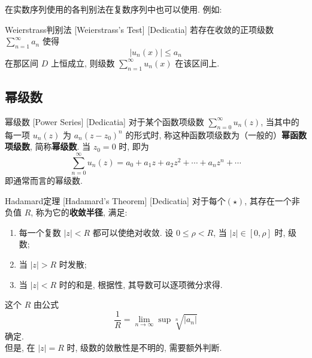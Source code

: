 \documentclass[UTF8]{ctexart}
\begin{document}
        在实数序列使用的各判别法在复数序列中也可以使用. 例如:

        \begin{thm}
            [UUID]
            {Weierstrass判别法}
            [Weierstrass's Test]
            [Dedicatia]
            若存在收敛的正项级数 \(\sum_{n = 1}^{\infty} a_n \) 使得\[|u_n(x)|\leqslant a_n\]
            在那区间 \(D\) 上恒成立, 则级数 \(\sum_{n = 1}^{\infty} u_n(x) \) 在该区间上. 
        \end{thm}
    
    \subsection{幂级数}

        \begin{dfn}
            [PowerSeries]
            {幂级数}
            [Power Series]
            [Dedicatia]
            对于某个函数项级数 \(\sum_{n = 0}^{\infty} u_n(z) \), 当其中的每一项 \(u_n(z)\) 为 \(a_n(z-z_0)^n\) 的形式时, 称这种函数项级数为（一般的）\textbf{幂函数项级数}, 简称\textbf{幂级数}. 当 \(z_0=0\) 时, 即为
            \[\sum_{n = 0}^{\infty} u_n(z)=a_0+a_1z+a_2z^2+\cdots+a_nz^n+\cdots \tag{ \(\star\) }\]
            即通常而言的幂级数. 
        \end{dfn}

        \begin{thm}
            [Hadamard]
            {Hadamard定理}
            [Hadamard's Theorem]
            [Dedicatia]
            对于每个\PowerSeries  \((\star)\), 其存在一个非负值 \(R\), 称为它的\textbf{收敛半径}, 满足: 
            \begin{enumerate}
                \item 每一个复数 \(|z|<R\) 都可以使\PowerSeries 绝对收敛. 设 \(0\leqslant\rho <R\), 当 \(|z|\in[0,\rho]\) 时, 级数; 
                \item 当 \(|z|>R\) 时\PowerSeries 发散; 
                \item 当 \(|z|<R\) 时的和是, 根据 性, 其导数可以逐项微分求得. 
            \end{enumerate}
            这个 \(R\) 由公式
            \[\frac{1}{R}=\lim_{n\to \infty}\sup\sqrt[n]{|a_n|}\]
            确定. \\
            但是, 在 \(|z|=R\) 时, 级数的敛散性是不明的, 需要额外判断. 
        \end{thm}
\end{document}
